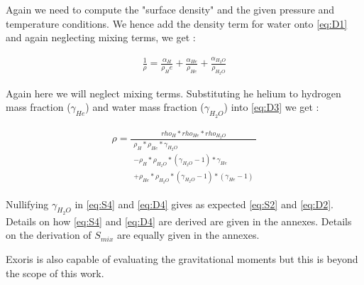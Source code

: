 Again we need to compute the "surface density" and the given pressure and temperature conditions. We hence add the density term for water onto \cref{eq:D1} and again neglecting mixing terms, we get :

\begin{align}
    \frac{1}{\rho} = \frac{\alpha_H}{\rho_He} +  \frac{\alpha_{He}}{\rho_{He}} +  \frac{\alpha_{H_2O}}{\rho_{H_2O}} \label{eq:D3}
\end{align}

Again here we will neglect mixing terms. Substituting he helium to hydrogen mass fraction ($\gamma_{He}$) and water mass fraction ($\gamma_{H_2O}$) into \cref{eq:D3} we get : 

\begin{align}
    \rho = \frac{rho_H*rho_{He}*rho_{H_2O}}{\begin{matrix}\rho_H*\rho_{He}*\gamma_{H_2O}\\-\rho_H*\rho_{H_2O}*(\gamma_{H_2O}-1)*\gamma_{He}\\+\rho_{He}*\rho_{H_2O}*(\gamma_{H_2O}-1)*(\gamma_{He}-1)\end{matrix}} \label{eq:D4}
\end{align}

Nullifying $\gamma_{H_2O}$ in \cref{eq:S4} and \cref{eq:D4} gives as expected \cref{eq:S2} and \cref{eq:D2}. Details on how \cref{eq:S4} and \cref{eq:D4} are derived are given in the annexes. Details on the derivation of $S_{mix}$ are equally given in the annexes.

Exoris is also capable of evaluating the gravitational moments but this is beyond the scope of this work.
